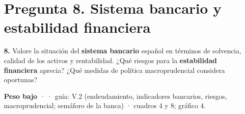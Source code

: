 \section*{Pregunta 8. Sistema bancario y estabilidad financiera}

\begin{enunciado}
\textbf{8.} Valore la situación del \textbf{sistema bancario} español en términos de solvencia, calidad de los activos y rentabilidad. ¿Qué riesgos para la \textbf{estabilidad financiera} aprecia? ¿Qué medidas de política macroprudencial considera oportunas?

\smallskip
\textbf{Peso bajo} ·  · guía: V.2 (endeudamiento, indicadores bancarios, riesgos, macroprudencial; semáforo de la banca) · cuadros 4 y 8; gráfico 4.
\end{enunciado}


